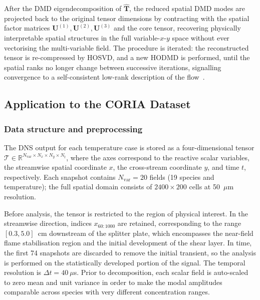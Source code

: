 After the DMD eigendecomposition of $\hat{\mathbf{T}}$, the reduced spatial DMD modes
are projected back to the original tensor dimensions by contracting with the spatial
factor matrices $\mathbf{U}^{(1)}, \mathbf{U}^{(2)}, \mathbf{U}^{(3)}$ and the core
tensor, recovering physically interpretable spatial structures in the full
variable-$x$-$y$ space without ever vectorising the multi-variable field.
The procedure is iterated: the reconstructed tensor is re-compressed by HOSVD, and a new
HODMD is performed, until the spatial ranks no longer change between successive
iterations, signalling convergence to a self-consistent low-rank description of the
flow~\cite{leclainche2017}.

\subsection{Application to the CORIA Dataset}
\label{sec:application_coria}

\subsubsection*{Data structure and preprocessing}

The DNS output for each temperature case is stored as a four-dimensional tensor
$\mathcal{T} \in \mathbb{R}^{N_{\mathrm{var}} \times N_x \times N_y \times N_t}$, where
the axes correspond to the reactive scalar variables, the streamwise spatial coordinate
$x$, the cross-stream coordinate $y$, and time $t$, respectively.
Each snapshot contains $N_{\mathrm{var}} = 20$ fields (19 species and temperature);
the full spatial domain consists of $2400 \times 200$ cells at 50~$\mu$m resolution.

Before analysis, the tensor is restricted to the region of physical interest.
In the streamwise direction, indices $x_{60:1000}$ are retained, corresponding to the
range $[0.3, 5.0]$~cm downstream of the splitter plate, which encompasses the near-field
flame stabilisation region and the initial development of the shear layer.
In time, the first 74 snapshots are discarded to remove the initial transient, so the
analysis is performed on the statistically developed portion of the signal.
The temporal resolution is $\Delta t = 40~\mu$s.
Prior to decomposition, each scalar field is auto-scaled to zero mean and unit variance
in order to make the modal amplitudes comparable across species with very different
concentration ranges.

